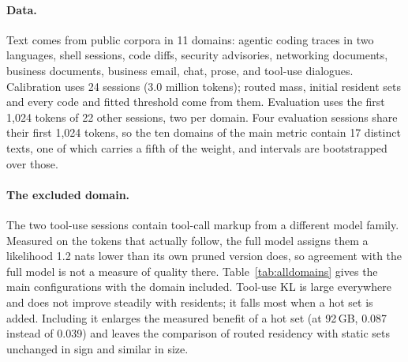 \documentclass[11pt]{article}
\begin{document}
\paragraph{Data.} Text comes from public corpora in 11 domains: agentic coding traces in two
languages, shell sessions, code diffs, security advisories, networking documents, business
documents, business email, chat, prose, and tool-use dialogues. Calibration uses 24 sessions
(3.0 million tokens); routed mass, initial resident sets and every code and fitted threshold
come from them. Evaluation uses the first 1{,}024 tokens of 22 other sessions, two per domain.
Four evaluation sessions share their first 1{,}024 tokens, so the ten domains of the main metric contain 17 distinct texts, one of which carries a fifth of the weight, and intervals are bootstrapped over those.

\paragraph{The excluded domain.} The two tool-use sessions contain tool-call markup from a
different model family. Measured on the tokens that actually follow, the full model assigns
them a likelihood 1.2 nats lower than its own pruned version does, so agreement with the full
model is not a measure of quality there. Table~\ref{tab:alldomains} gives the main
configurations with the domain included. Tool-use KL is large everywhere and does not improve
steadily with residents; it falls most when a hot set is added. Including it enlarges the
measured benefit of a hot set (at 92\,GB, 0.087 instead of 0.039) and leaves the comparison of
routed residency with static sets unchanged in sign and similar in size.
\end{document}
